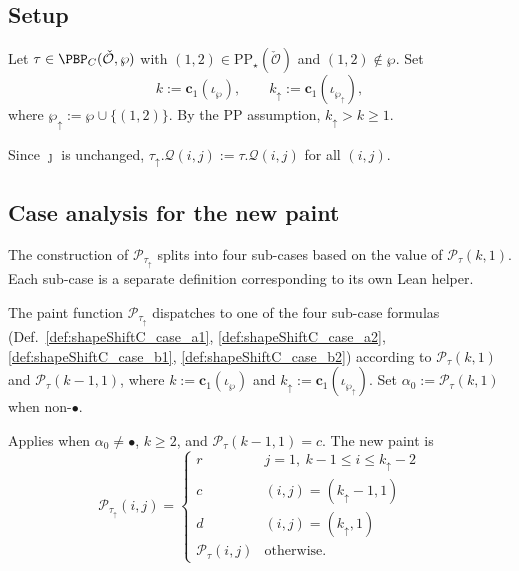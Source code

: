 \subsection{Setup}

Let $\tau \in \PBP_C(\check{\mathcal{O}}, \wp)$ with $(1, 2) \in \mathrm{PP}_\star(\check{\mathcal{O}})$ and $(1, 2) \notin \wp$. Set
\[ k := \mathbf{c}_1(\iota_\wp),\qquad k_\uparrow := \mathbf{c}_1(\iota_{\wp_\uparrow}), \]
where $\wp_\uparrow := \wp \cup \{(1, 2)\}$. By the PP assumption, $k_\uparrow > k \geq 1$.

Since $\jmath$ is unchanged, $\tau_\uparrow.\mathcal{Q}(i, j) := \tau.\mathcal{Q}(i, j)$ for all $(i, j)$.

\subsection{Case analysis for the new paint}

The construction of $\mathcal{P}_{\tau_\uparrow}$ splits into four sub-cases
based on the value of $\mathcal{P}_\tau(k, 1)$. Each sub-case is a separate
definition corresponding to its own Lean helper.

\begin{definition}
  \label{def:shapeShiftC_paint}
  \leanok
  The paint function $\mathcal{P}_{\tau_\uparrow}$ dispatches to one of the
  four sub-case formulas
  (Def.~\ref{def:shapeShiftC_case_a1},
  \ref{def:shapeShiftC_case_a2},
  \ref{def:shapeShiftC_case_b1},
  \ref{def:shapeShiftC_case_b2})
  according to $\mathcal{P}_\tau(k, 1)$ and $\mathcal{P}_\tau(k - 1, 1)$,
  where $k := \mathbf{c}_1(\iota_\wp)$ and $k_\uparrow := \mathbf{c}_1(\iota_{\wp_\uparrow})$.
  Set $\alpha_0 := \mathcal{P}_\tau(k, 1)$ when non-$\bullet$.
\end{definition}

\begin{definition}
  \label{def:shapeShiftC_case_a1}
  \leanok
  Applies when $\alpha_0 \neq \bullet$, $k \geq 2$, and $\mathcal{P}_\tau(k - 1, 1) = c$.
  The new paint is
  \[
    \mathcal{P}_{\tau_\uparrow}(i, j) =
    \begin{cases}
      r & j = 1,\ k - 1 \leq i \leq k_\uparrow - 2 \\
      c & (i, j) = (k_\uparrow - 1, 1) \\
      d & (i, j) = (k_\uparrow, 1) \\
      \mathcal{P}_\tau(i, j) & \text{otherwise.}
    \end{cases}
  \]
  \end{definition}

